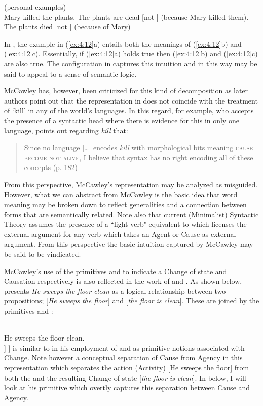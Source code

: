 \ea%
\label{ex:4:12}
(personal examples)\\
\ea Mary killed the plants.
\ex The plants are dead [not \ALIVE] (because Mary killed them).
\ex The plants died [\BECOME not \ALIVE] (because of Mary) 
\z \z

In , the example in (\ref{ex:4:12}a) entails both the meanings of (\ref{ex:4:12}b) and
(\ref{ex:4:12}c). Essentially, if (\ref{ex:4:12}a) holds true then (\ref{ex:4:12}b)
and (\ref{ex:4:12}c) are also true.  The configuration in
 captures this intuition and in this way may be said to
appeal to a sense of semantic logic.

McCawley has, however, been criticized for this kind of decomposition
as later authors point out that the representation in 
does not coincide with the treatment of ‘kill’ in any of the world’s
languages.  In this regard, \citet{Travis2000} for example, who
accepts the presence of a syntactic head where there is evidence for
this in only one language, points out regarding \textit{kill} that:

\begin{quote}
Since no language […] encodes \textit{kill} with morphological bits
meaning \textsc{cause become not alive}, I believe that syntax has no right
encoding all of these concepts (p. 182)
\end{quote}

From this perspective, McCawley’s representation may be analyzed as
misguided.  However, what we can abstract from McCawley is the basic
idea that word meaning may be broken down to reflect generalities and
a connection between forms that are semantically related.  Note also
that current (Minimalist) Syntactic Theory assumes the presence of a
``light verb" equivalent to \CAUSE which licenses the external argument
for any verb which takes an Agent or Cause as external argument.  From
this perspective the basic intuition captured by McCawley may be said
to be vindicated.

McCawley’s use of the primitives \BECOME and \CAUSE to indicate a Change
of state and Causation respectively is also reflected in the work of
\citet{Dowty1979} and \citet{Carter1976}.  As shown below,
\citet{Dowty1979} presents \textit{He sweeps the floor clean} as a
logical relationship between two propositions; [\textit{He sweeps the floor}]
and [\textit{the floor is clean}].  These are joined by the primitives
\CAUSE and \BECOME:

\ea%
\label{ex:4:13}
\citep[93]{Dowty1979}\\
He sweeps the floor clean.\\\relax
[ [He sweeps the floor] \CAUSE [ \BECOME [\textit{the floor is
  clean}] ] ]
\z
\citet{Dowty1979} is similar to \citet{McCawley1968} in his
employment of \CAUSE and \BECOME as primitive notions associated with
Change.  Note however a conceptual separation of Cause from Agency in
this representation which separates the action (Activity) [He sweeps
the floor] from both the \CAUSE and the resulting Change of state
[\textit{the floor is clean}].  In  below, I will
look at his \DO primitive which overtly captures this separation
between Cause and Agency.

